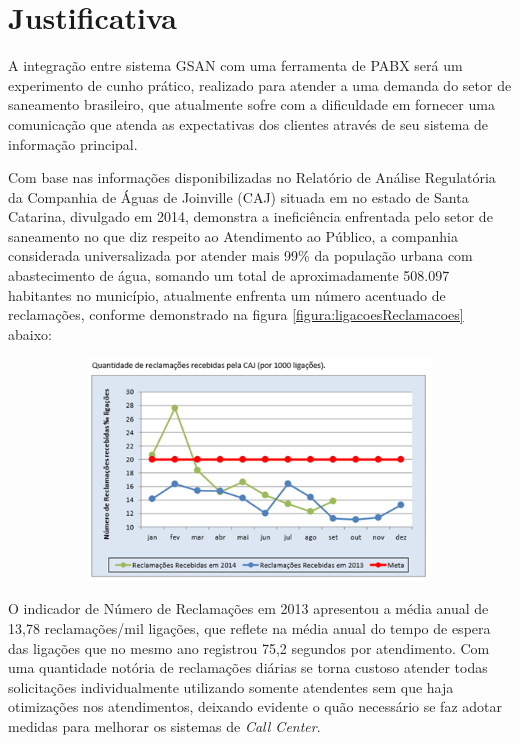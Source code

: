 \section*{Justificativa}
A integração entre sistema GSAN com uma ferramenta de PABX será um experimento de cunho prático, realizado para atender a uma demanda do setor de saneamento brasileiro, que atualmente sofre com a dificuldade em fornecer uma comunicação que atenda as expectativas dos clientes através de seu sistema de informação principal.

Com base nas informações disponibilizadas no Relatório de Análise Regulatória da Companhia de Águas de Joinville (CAJ) \cite{AMAE2014} 
situada em no estado de Santa Catarina, divulgado em 2014, demonstra a ineficiência enfrentada pelo setor de saneamento no que diz respeito ao Atendimento ao Público, a companhia considerada universalizada por atender mais 99\% da população urbana com abastecimento de água, somando um total de aproximadamente 508.097 habitantes no município, atualmente enfrenta um número acentuado de reclamações, conforme demonstrado na figura \ref{figura:ligacoesReclamacoes} abaixo:
 


\begin{figure}[H]
	\centering
	\caption{Gráfico da Quantidade de Reclamações Mensais da CAJ}
	\label{figura:ligacoesReclamacoes}
	\begin{subfigure}[H]{\textwidth}
		\centering
		\includegraphics{figuras/LigacoesReclamacoes.png}
	\end{subfigure}
\end{figure}



 O indicador de Número de Reclamações em 2013 apresentou a média anual de 13,78 reclamações/mil ligações, que reflete na média anual do tempo de espera das ligações que no mesmo ano registrou 75,2 segundos por atendimento. Com uma quantidade notória de reclamações diárias se torna custoso atender todas solicitações individualmente utilizando somente atendentes sem que haja otimizações nos atendimentos,   deixando evidente o quão necessário se faz adotar medidas para melhorar os sistemas de \textit{Call Center}. 
 
